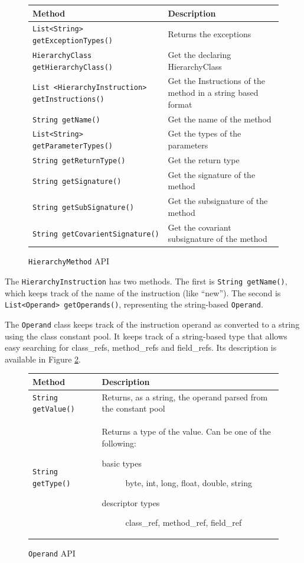 \documentclass{sigplanconf}
\begin{document}
\begin{figure}[htbf]
\begin{tabularx}{\columnwidth}{|XX|}
\hline
{\bf Method} & {\bf Description }\\\hline
{\tt List<String> getExceptionTypes()} &  Returns the exceptions\\\hline 
{\tt HierarchyClass getHierarchyClass()} & Get
   the declaring HierarchyClass\\\hline 
{\tt List
    <HierarchyInstruction>
    getInstructions()} & Get the 
    Instructions of the method in a string based format\\\hline 
{\tt String getName()} & Get the name of the method\\\hline 
{\tt List<String> getParameterTypes()} & Get the types of the parameters\\\hline
{\tt String getReturnType()} & Get the return type\\\hline
{\tt String getSignature()} & Get the signature of the method\\\hline  
{\tt String getSubSignature()} & Get the subsignature of the method\\\hline
{\tt String getCovarientSignature()} & Get the covariant subsignature of the method\\\hline
\end{tabularx}
\caption{{\tt HierarchyMethod} API}
\label{fig:rbhm}
\end{figure}

The {\tt HierarchyInstruction} has two methods. The first is {\tt String getName()}, which keeps track of the name of the instruction (like “new”). The second is {\tt List<Operand> getOperands()}, representing the string-based {\tt Operand}.

The {\tt Operand} class keeps track of the instruction operand as converted to a string using the class constant pool. It keeps track of a string-based type that allows easy searching for class\_refs, method\_refs and field\_refs. Its description is available in Figure \ref{fig:operand}. 

\begin{figure}[htbf]
\begin{tabularx}{\columnwidth}{|lX|}
\hline
{\bf Method} & {\bf Description }\\\hline
{\tt String getValue()} &  Returns, as a string, the operand parsed 
    from the constant pool\\\hline 
{\tt String getType()} & Returns a type of the value. Can be one
    of the following:
    \begin{description}
      \item[basic types] byte, int, long, float, double, string
      \item[descriptor types] class\_ref, method\_ref, field\_ref
    \end{description}
\\\hline 
\end{tabularx}
\caption{{\tt Operand} API}
\label{fig:operand}
\end{figure}
\end{document}
